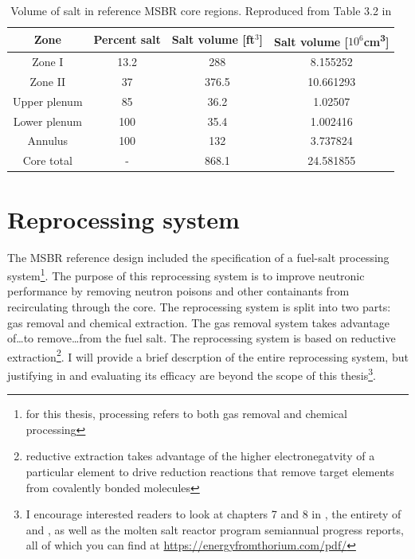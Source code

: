 \begin{table}[htpb]
    \centering
    \caption[Volume of salt in reference MSBR core regions]{Volume of salt in
reference MSBR core regions. Reproduced from Table 3.2 in
\cite{robertson_conceptual_1971}}
    \label{tab:salt-volumes}
    \begin{tabular}{|c|c|cc|}
        \hline
        Zone & Percent salt & Salt volume [ft$^3$] & Salt volume [$10^6$\unit{\centi\metre\cubed}] \\
        \hline
        Zone I & 13.2 & 288 & 8.155252 \\
        \hline
        Zone II & 37 & 376.5 & 10.661293 \\
        \hline
        Upper plenum & 85 & 36.2 & 1.02507 \\ 
        \hline
        Lower plenum & 100 & 35.4 & 1.002416 \\ 
        \hline
        Annulus & 100 &  132 & 3.737824\\
        \hline
        Core total & - & 868.1 & 24.581855 \\ 
        \hline
    \end{tabular}
\end{table}

\section{Reprocessing system}
\label{sec:msbr-reprocessing-system}
The MSBR reference design included the specification of a fuel-salt processing
system\footnote{for this thesis, processing refers to both gas removal and
chemical processing}. The purpose of this reprocessing system is to improve neutronic performance by removing neutron poisons and other containants from recirculating through the core. The reprocessing system is split into two parts: gas removal and chemical extraction. The gas removal system takes advantage of\ldots to remove\ldots from the fuel salt. The reprocessing system is based on reductive extraction\footnote{reductive
extraction takes advantage of the higher electronegatvity of a particular
element to drive reduction reactions that remove target elements from covalently
bonded molecules}. I will provide a brief descrption of the entire reprocessing system,
but justifying in and evaluating its efficacy are beyond the scope of this thesis\footnote{I
encourage interested readers to look at chapters 7 and 8 in
\cite{robertson_conceptual_1971}, the entirety of \cite{carter_design_1972} and
\cite{lindauer_design_1969}, as well as the molten salt reactor program
semiannual progress reports, all of which you can find at
\href{energyfromthorium.com/url}{https://energyfromthorium.com/pdf/}}.

